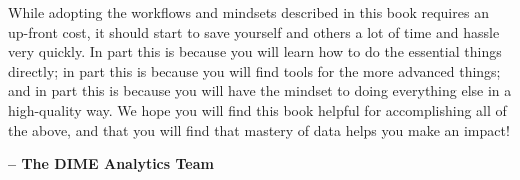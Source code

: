 While adopting the workflows and mindsets described in this book
requires an up-front cost,
it should start to save yourself and others a lot of time and hassle very quickly.
In part this is because you will learn how to do the essential things directly;
in part this is because you will find tools for the more advanced things;
and in part this is because you will have the mindset to doing everything else in a high-quality way.
We hope you will find this book helpful for accomplishing all of the above,
and that you will find that mastery of data helps you make an impact!

\textbf{-- The DIME Analytics Team}

\mainmatter

